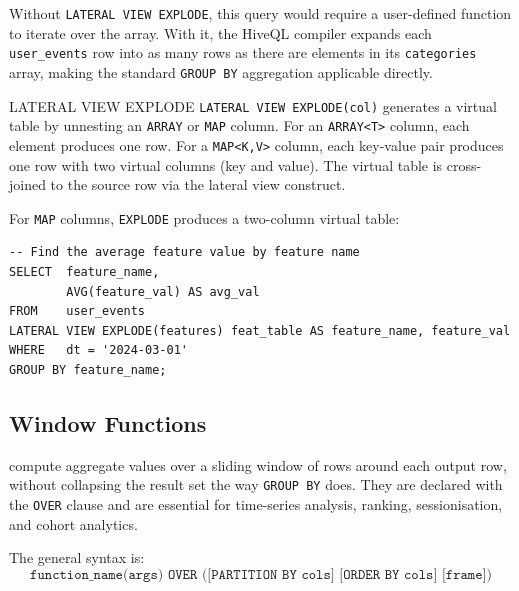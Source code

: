 Without \texttt{LATERAL VIEW EXPLODE}, this query would require a
user-defined function to iterate over the array. With it, the HiveQL
compiler expands each \texttt{user\_events} row into as many rows as
there are elements in its \texttt{categories} array, making the standard
\texttt{GROUP BY} aggregation applicable directly.

\begin{defbox}{LATERAL VIEW EXPLODE}
\texttt{LATERAL VIEW EXPLODE(col)} generates a virtual table by
unnesting an \texttt{ARRAY} or \texttt{MAP} column. For an
\texttt{ARRAY<T>} column, each element produces one row. For a
\texttt{MAP<K,V>} column, each key-value pair produces one row
with two virtual columns (key and value). The virtual table is
cross-joined to the source row via the lateral view construct.
\end{defbox}

For \texttt{MAP} columns, \texttt{EXPLODE} produces a two-column
virtual table:

\begin{lstlisting}[style=hiveql, caption={HiveQL: EXPLODE on a MAP column}]
-- Find the average feature value by feature name
SELECT  feature_name,
        AVG(feature_val) AS avg_val
FROM    user_events
LATERAL VIEW EXPLODE(features) feat_table AS feature_name, feature_val
WHERE   dt = '2024-03-01'
GROUP BY feature_name;
\end{lstlisting}

\subsection{Window Functions}
\label{subsec:window-functions}

 compute aggregate values over a sliding window
of rows around each output row, without collapsing the result set the
way \texttt{GROUP BY} does. They are declared with the \texttt{OVER}
clause and are essential for time-series analysis, ranking, sessionisation,
and cohort analytics.

The general syntax is:
\[
\texttt{function\_name(args) OVER ([PARTITION BY cols] [ORDER BY cols] [frame])}
\]

